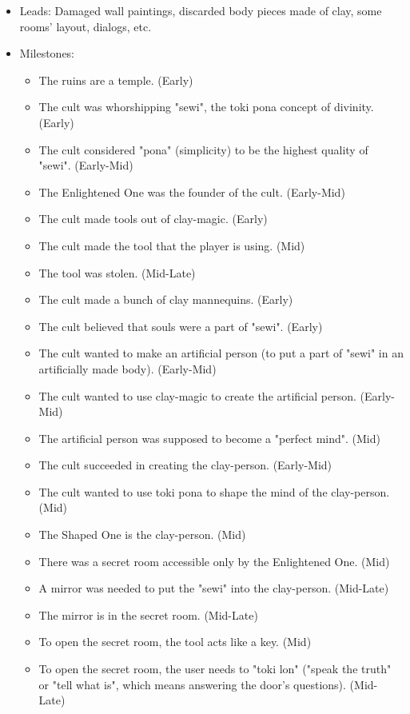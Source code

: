 \documentclass{scrartcl}
\begin{document}
\begin{itemize}
\begin{itemize}
				\item Leads: Damaged wall paintings, discarded body pieces made of clay, some rooms' layout, dialogs, etc.
				\item Milestones:
					\begin{itemize}
						\item The ruins are a temple. (Early)
						\item The cult was whorshipping "sewi", the toki pona concept of divinity. (Early)
						\item The cult considered "pona" (simplicity) to be the highest quality of "sewi". (Early-Mid)
						\item The Enlightened One was the founder of the cult. (Early-Mid)
						\item The cult made tools out of clay-magic. (Early)
						\item The cult made the tool that the player is using. (Mid)
						\item The tool was stolen. (Mid-Late)
						\item The cult made a bunch of clay mannequins. (Early)
						\item The cult believed that souls were a part of "sewi". (Early)
						\item The cult wanted to make an artificial person (to put a part of "sewi" in an artificially made body). (Early-Mid)
						\item The cult wanted to use clay-magic to create the artificial person. (Early-Mid)
						\item The artificial person was supposed to become a "perfect mind". (Mid)
						\item The cult succeeded in creating the clay-person. (Early-Mid)
						\item The cult wanted to use toki pona to shape the mind of the clay-person. (Mid)
						\item The Shaped One is the clay-person. (Mid)
						\item There was a secret room accessible only by the Enlightened One. (Mid)
						\item A mirror was needed to put the "sewi" into the clay-person. (Mid-Late)
						\item The mirror is in the secret room. (Mid-Late)
						\item To open the secret room, the tool acts like a key. (Mid)
						\item To open the secret room, the user needs to "toki lon" ("speak the truth" or "tell what is", which means answering the door's questions). (Mid-Late)

\end{itemize}
\end{itemize}
\end{itemize}
\end{document}
